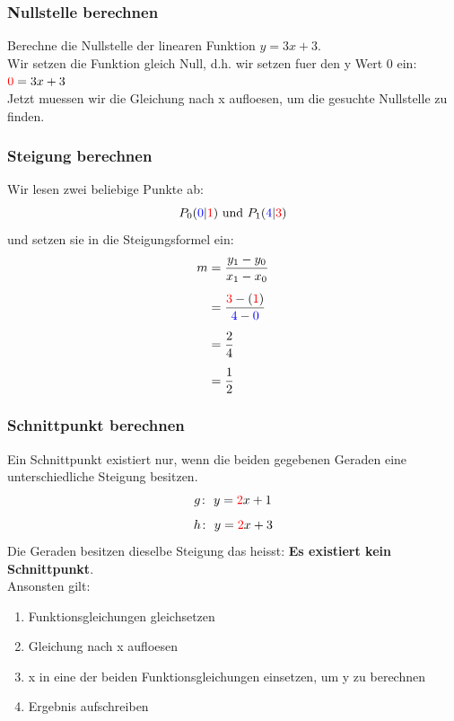 \begin{multicols}{2}
    \subsubsection{Nullstelle berechnen}
    \vspace{-4mm}

    Berechne die Nullstelle der linearen Funktion  $y = 3x + 3$. \\
    Wir setzen die Funktion gleich Null, d.h. wir setzen fuer den y Wert 0 ein: ${\color{red}{0}} = 3x + 3$ \\
    Jetzt muessen wir die Gleichung nach x aufloesen, um die gesuchte Nullstelle zu finden.
    \subsubsection{Steigung berechnen}
    Wir lesen zwei beliebige Punkte ab:
    \[P_0({\color{blue}0}|{\color{red}1}) \text{ und } P_1({\color{blue}4}|{\color{red}3})\]
    und setzen sie in die Steigungsformel ein:
    \begin{align*} m &= \frac{y_1 - y_0}{x_1 - x_0} \\[5px] &= \frac{{\color{red}3} - ({\color{red}1})}{{\color{blue}4} - {\color{blue}0}}\\[5px] &= \frac{2}{4} \\[5px] &= \frac{1}{2} \end{align*}
    \subsubsection{Schnittpunkt berechnen}
    \vspace{-4mm}

    Ein Schnittpunkt existiert nur, wenn die beiden gegebenen Geraden eine unterschiedliche Steigung besitzen.
    \[g\colon~y = {\color{red}2}x + 1\]
    \[h\colon~y = {\color{red}2}x + 3\]
    Die Geraden besitzen dieselbe Steigung das heisst: \textbf{Es existiert kein Schnittpunkt}.\\
    Ansonsten gilt:
    \begin{enumerate}
        \item Funktionsgleichungen gleichsetzen
        \item Gleichung nach x aufloesen
        \item x in eine der beiden Funktionsgleichungen einsetzen, um y zu berechnen
        \item Ergebnis aufschreiben
    \end{enumerate}


\end{multicols}
